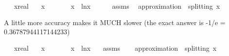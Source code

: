 \begin{isabellebody}
\isamarkupfalse%
\isanewline
\ \ \ x{\isacharcolon}{\kern0pt}{\isacharcolon}{\kern0pt}real\isanewline
\ \ \ {\isachardoublequoteopen}x\ {\isasymin}\ {\isacharbraceleft}{\kern0pt}{}{\isachardot}{\kern0pt}{}\ {\isachardot}{\kern0pt}{\isachardot}{\kern0pt}\ {}{\isacharbraceright}{\kern0pt}{\isachardoublequoteclose}\isanewline
\ \ \ {\isachardoublequoteopen}x\ {\isacharasterisk}{\kern0pt}\ ln{\isacharparenleft}{\kern0pt}x{\isacharparenright}{\kern0pt}\ {\isasymge}\ {\isacharminus}{\kern0pt}{}{\isachardot}{\kern0pt}{}{}{}{\isachardoublequoteclose}\isanewline
%
\isadelimproof
\ \ %
\endisadelimproof
%
\isatagproof
{}\isamarkupfalse%
\ assms\ \isamarkupfalse%
\ {\isacharparenleft}{\kern0pt}approximation\ {}{}\ splitting{\isacharcolon}{\kern0pt}\ x{\isacharequal}{\kern0pt}{}{}{\isacharparenright}{\kern0pt}%
\endisatagproof
{\isafoldproof}%
%
\isadelimproof
%
\endisadelimproof
%
\begin{isamarkuptext}%
A little more accuracy makes it MUCH slower 
  (the exact answer is -1/e = 0.36787944117144233)%
\end{isamarkuptext}\isamarkuptrue%
\isamarkupfalse%
\isanewline
\ \ \ x{\isacharcolon}{\kern0pt}{\isacharcolon}{\kern0pt}real\isanewline
\ \ \ {\isachardoublequoteopen}x\ {\isasymin}\ {\isacharbraceleft}{\kern0pt}{}{\isachardot}{\kern0pt}{}\ {\isachardot}{\kern0pt}{\isachardot}{\kern0pt}\ {}{\isacharbraceright}{\kern0pt}{\isachardoublequoteclose}\isanewline
\ \ \ {\isachardoublequoteopen}x\ {\isacharasterisk}{\kern0pt}\ ln{\isacharparenleft}{\kern0pt}x{\isacharparenright}{\kern0pt}\ {\isasymge}\ {\isacharminus}{\kern0pt}{}{\isachardot}{\kern0pt}{}{}{}{}{\isachardoublequoteclose}\isanewline
%
\isadelimproof
%
\endisadelimproof
%
\isatagproof
{}\isamarkupfalse%
\ assms\isanewline
\ \ \isamarkupfalse%
\ {\isacharparenleft}{\kern0pt}approximation\ {}{}\ splitting{\isacharcolon}{\kern0pt}\ x{\isacharequal}{\kern0pt}{}{}{\isacharparenright}{\kern0pt}%
\endisatagproof
{\isafoldproof}%
%
\isadelimproof
\ \isanewline
%
\endisadelimproof
%
\isadelimtheory
\isanewline
%
\endisadelimtheory
%
\isatagtheory
{}\isamarkupfalse%
%
\endisatagtheory
{\isafoldtheory}%
%
\isadelimtheory
%
\endisadelimtheory
%
\end{isabellebody}%
